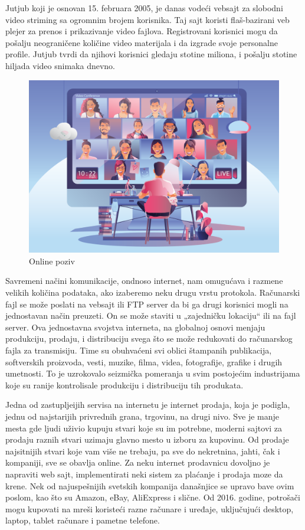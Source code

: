 \documentclass[10pt]{article}
\begin{document}
	Jutjub koji je osnovan 15. februara 2005, je danas vodeći vebsajt za slobodni video striming sa ogromnim brojem korisnika. Taj sajt koristi flaš-bazirani veb plejer za prenos i prikazivanje video fajlova. Registrovani korisnici mogu da pošalju neograničene količine video materijala i da izgrade svoje personalne profile. Jutjub tvrdi da njihovi korisnici gledaju stotine miliona, i pošalju stotine hiljada video snimaka dnevno.

\begin{figure}
    \centering
    \includegraphics[scale=0.2]{poziv.png}
    \caption{Online poziv}
\end{figure}

	Savremeni načini komunikacije, ondnoso internet, nam omugućava i razmene velikih količina podataka, ako izaberemo neku drugu vrstu protokola. Računarski fajl se može poslati na vebsajt ili FTP server da bi ga drugi korisnici mogli na jednostavan način preuzeti. On se može staviti u „zajedničku lokaciju“ ili na fajl server.  Ova jednostavna svojstva interneta, na globalnoj osnovi menjaju produkciju, prodaju, i distribuciju svega što se može redukovati do računarskog fajla za transmisiju. Time su obuhvaćeni svi oblici štampanih publikacija, softverskih proizvoda, vesti, muzike, filma, videa, fotografije, grafike i drugih umetnosti. To je uzrokovalo seizmička pomeranja u svim postojećim industrijama koje su ranije kontrolisale produkciju i distribuciju tih produkata.

	Jedna od zastupljeijih servisa na internetu je internet prodaja, koja je podigla, jednu od najstarijih privrednih grana, trgovinu, na drugi nivo. Sve je manje mesta gde ljudi uživio kupuju stvari koje su im potrebne, moderni sajtovi za prodaju raznih stvari uzimaju glavno mesto u izboru za kupovinu. Od prodaje najsitnijih stvari koje vam više ne trebaju, pa sve do nekretnina, jahti, čak i kompaniji, sve se obavlja online. Za neku internet prodavnicu dovoljno je napraviti web sajt, implementirati neki sistem za plaćanje i prodaja moze da krene. Nek od najuspešnijih svetskih kompanija današnjice se upravo bave ovim poslom, kao što su Amazon, eBay, AliExpress i slične. Od 2016. godine, potrošači mogu kupovati na mreši koristeći razne računare i uređaje, uključujući desktop, laptop, tablet računare i pametne telefone.
\end{document}
